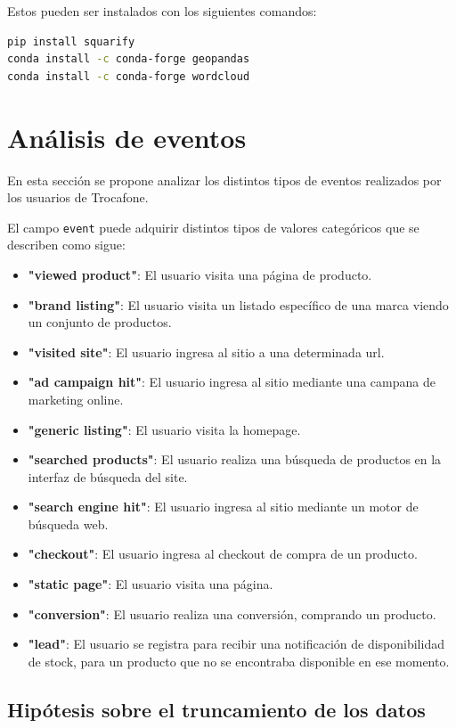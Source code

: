 \documentclass[a4paper]{article}
\begin{document}
Estos pueden ser instalados con los siguientes comandos: 
\begin{lstlisting}[language=sh]
pip install squarify
conda install -c conda-forge geopandas
conda install -c conda-forge wordcloud
\end{lstlisting}

\section{Análisis de eventos}

En esta sección se propone analizar los distintos tipos de eventos realizados por los usuarios de Trocafone. 

El campo \texttt{event} puede adquirir distintos tipos de valores categóricos que se describen como sigue:

\begin{itemize}
	\item \textbf{"viewed product"}: El usuario visita una página de producto.
	\item \textbf{"brand listing"}: El usuario visita un listado específico de una marca viendo un conjunto de productos.
	\item \textbf{"visited site"}:  El usuario ingresa al sitio a una determinada url.
	\item \textbf{"ad campaign hit"}: El usuario ingresa al sitio mediante una campana de marketing online.
	\item \textbf{"generic listing"}: El usuario visita la homepage.
	\item \textbf{"searched products"}: El usuario realiza una búsqueda de productos en la interfaz de búsqueda del site.
	\item \textbf{"search engine hit"}: El usuario ingresa al sitio mediante un motor de búsqueda web.
	\item \textbf{"checkout"}: El usuario ingresa al checkout de compra de un producto.
	\item \textbf{"static page"}:  El usuario visita una página.
	\item \textbf{"conversion"}: El usuario realiza una conversión, comprando un producto.
	\item \textbf{"lead"}: El usuario se registra para recibir una notificación de disponibilidad de stock, para un producto que no se encontraba disponible en ese momento.					
\end{itemize}

\subsection{Hipótesis sobre el truncamiento de los datos}
\end{document}
